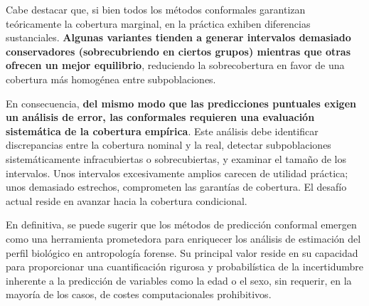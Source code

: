 
Cabe destacar que, si bien todos los métodos conformales garantizan teóricamente la cobertura marginal, en la práctica exhiben diferencias sustanciales. \textbf{Algunas variantes tienden a generar intervalos demasiado conservadores (sobrecubriendo en ciertos grupos) mientras que otras ofrecen un mejor equilibrio}, reduciendo la sobrecobertura en favor de una cobertura más homogénea entre subpoblaciones. 

En consecuencia, \textbf{del mismo modo que las predicciones puntuales exigen un análisis de error, las conformales requieren una evaluación sistemática de la cobertura empírica}. Este análisis debe identificar discrepancias entre la cobertura nominal y la real, detectar subpoblaciones sistemáticamente infracubiertas o sobrecubiertas, y examinar el tamaño de los intervalos. Unos intervalos excesivamente amplios carecen de utilidad práctica; unos demasiado estrechos, comprometen las garantías de cobertura. El desafío actual reside en avanzar hacia la cobertura condicional.



En definitiva, se puede sugerir que los métodos de predicción conformal emergen como una herramienta prometedora para enriquecer los análisis de estimación del perfil biológico en antropología forense. Su principal valor reside en su capacidad para proporcionar una cuantificación rigurosa y probabilística de la incertidumbre inherente a la predicción de variables como la edad o el sexo, sin requerir, en la mayoría de los casos, de costes computacionales prohibitivos.








